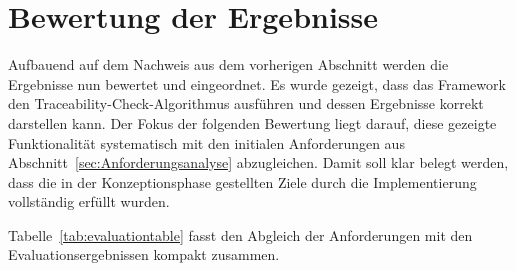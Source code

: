 \section{Bewertung der Ergebnisse}
\label{sec:analyse}

Aufbauend auf dem Nachweis aus dem vorherigen Abschnitt werden die Ergebnisse nun bewertet und eingeordnet. Es wurde gezeigt, dass das Framework den Traceability-Check-Algorithmus ausführen und dessen Ergebnisse korrekt darstellen kann. Der Fokus der folgenden Bewertung liegt darauf, diese gezeigte Funktionalität systematisch mit den initialen Anforderungen aus Abschnitt~\ref{sec:Anforderungsanalyse} abzugleichen. Damit soll klar belegt werden, dass die in der Konzeptionsphase gestellten Ziele durch die Implementierung vollständig erfüllt wurden.

Tabelle~\ref{tab:evaluationtable} fasst den Abgleich der Anforderungen mit den Evaluationsergebnissen kompakt zusammen.

